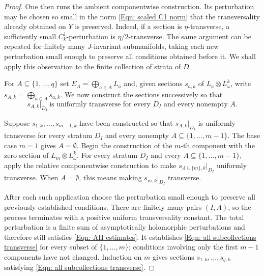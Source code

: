 \documentclass[11pt]{amsart}
\numberwithin{equation}{section}
\theoremstyle{plain}
\theoremstyle{definition}
\begin{document}
\begin{proof}
One then runs the ambient componentwise construction. Its perturbation may be
chosen so small in the norm \eqref{Eqn: scaled C1 norm} that the
transversality already obtained on $Y$ is preserved. Indeed, if a section is
$\eta$-transverse, a sufficiently small $C^1_k$-perturbation is
$\eta/2$-transverse. The same argument can be repeated for finitely many
$J$-invariant submanifolds, taking each new perturbation small enough to
preserve all conditions obtained before it. We shall apply this observation
to the finite collection of strata of $D$.

For $A\subseteq\{1,\ldots,q\}$ set
$E_A=\bigoplus_{a\in A}L_a$ and, given sections $s_{a,k}$ of
$L_a\otimes L_\omega^k$, write
$s_{A,k}=\bigoplus_{a\in A}s_{a,k}$. We now construct the sections
successively so that
\begin{equation}
\label{Eqn: all subcollections transverse}
s_{A,k}|_{D_I}\ \text{is uniformly transverse for every }D_I
\text{ and every nonempty }A.
\end{equation}

Suppose $s_{1,k},\ldots,s_{m-1,k}$ have been constructed so that
$s_{A,k}|_{D_I}$ is uniformly transverse for every stratum $D_I$ and every
nonempty $A\subseteq\{1,\ldots,m-1\}$. The base case $m=1$ gives
$A=\emptyset$. Begin the construction of the $m$-th component with the zero
section of $L_m\otimes L_\omega^k$. For every stratum $D_I$ and every
$A\subseteq\{1,\ldots,m-1\}$, apply the relative componentwise construction to
make $s_{A\cup\{m\},k}|_{D_I}$ uniformly transverse. When $A=\emptyset$, this
means making $s_{m,k}|_{D_I}$ transverse.

After each such application choose the perturbation small enough to preserve all
previously established conditions. There are finitely many pairs $(I,A)$, so the
process terminates with a positive uniform transversality constant. The total
perturbation is a finite sum of asymptotically holomorphic perturbations and
therefore still satisfies \eqref{Eqn: AH estimates}. It establishes \eqref{Eqn:
all subcollections transverse} for every subset of $\{1,\ldots,m\}$; conditions
involving only the first $m-1$ components have not changed. Induction on $m$
gives sections $s_{1,k},\ldots,s_{q,k}$ satisfying \eqref{Eqn: all
subcollections transverse}.


\end{proof}
\end{document}
